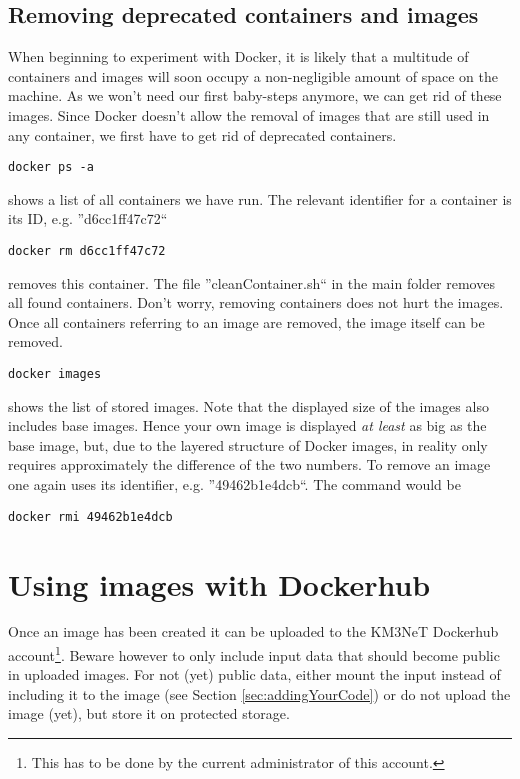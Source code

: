 \documentclass[a4paper, twoside, 11pt]{article}
\begin{document}
\subsection{Removing deprecated containers and images}
When beginning to experiment with Docker, it is likely that a multitude of containers and images will  
soon occupy a non-negligible amount of space on the machine. 
As we won't need our first baby-steps anymore, we can get rid of these images. 
Since Docker doesn't allow the removal of images that are still used in any container, 
we first have to get rid of deprecated containers. 
\begin{lstlisting}[basicstyle=\footnotesize\ttfamily,frame=single]
docker ps -a
\end{lstlisting}
shows a list of all containers we have run. 
The relevant identifier for a container is its ID, e.g. ''d6cc1ff47c72``
\begin{lstlisting}[basicstyle=\footnotesize\ttfamily,frame=single]
docker rm d6cc1ff47c72
\end{lstlisting}
removes this container. 
The file ''cleanContainer.sh`` in the main folder removes all found containers. 
Don't worry, removing containers does not hurt the images. 
Once all containers referring to an image are removed, the image itself can be removed.
\begin{lstlisting}[basicstyle=\footnotesize\ttfamily,frame=single]
docker images
\end{lstlisting}
shows the list of stored images. 
Note that the displayed size of the images also includes base images. 
Hence your own image is displayed \textit{at least} as big as the base image, 
but, due to the layered structure of Docker images, in reality only requires approximately the difference of the two numbers. 
To remove an image one again uses its identifier, e.g. ''49462b1e4dcb``. 
The command would be 
\begin{lstlisting}[basicstyle=\footnotesize\ttfamily,frame=single]
docker rmi 49462b1e4dcb
\end{lstlisting}

\section{Using images with Dockerhub}

Once an image has been created it can be uploaded to the 
KM3NeT Dockerhub account\footnote{This has to be done by the current administrator of this account.}. 
Beware however to only include input data that should become public in uploaded images. 
For not (yet) public data, either mount the input instead of including 
it to the image (see Section \ref{sec:addingYourCode}) 
or do not upload the image (yet), but store it on protected storage. 
\end{document}
